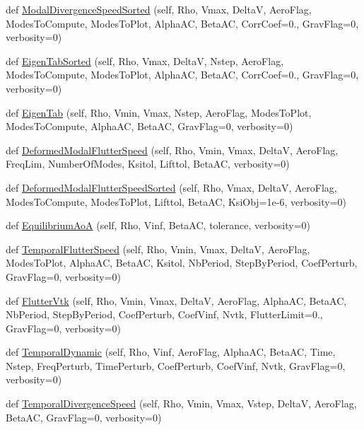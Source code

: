 \begin{DoxyCompactItemize}
\item 
def \hyperlink{classgebtaero_1_1_simulation_1_1_simulation_a597d75e677892bd4308a6537a27eedb8}{Modal\+Divergence\+Speed\+Sorted} (self, Rho, Vmax, DeltaV, Aero\+Flag, Modes\+To\+Compute, Modes\+To\+Plot, Alpha\+AC, Beta\+AC, Corr\+Coef=0., Grav\+Flag=0, verbosity=0)
\item 
def \hyperlink{classgebtaero_1_1_simulation_1_1_simulation_ae64bf3c9cef715d9d999acef888a840e}{Eigen\+Tab\+Sorted} (self, Rho, Vmax, DeltaV, Nstep, Aero\+Flag, Modes\+To\+Compute, Modes\+To\+Plot, Alpha\+AC, Beta\+AC, Corr\+Coef=0., Grav\+Flag=0, verbosity=0)
\item 
def \hyperlink{classgebtaero_1_1_simulation_1_1_simulation_a2907ad4a52664321ef36ca2d05a5ea64}{Eigen\+Tab} (self, Rho, Vmin, Vmax, Nstep, Aero\+Flag, Modes\+To\+Plot, Modes\+To\+Compute, Alpha\+AC, Beta\+AC, Grav\+Flag=0, verbosity=0)
\item 
def \hyperlink{classgebtaero_1_1_simulation_1_1_simulation_a0e2bbc13e4dd2169d7f5a868b7295bd9}{Deformed\+Modal\+Flutter\+Speed} (self, Rho, Vmin, Vmax, DeltaV, Aero\+Flag, Freq\+Lim, Number\+Of\+Modes, Ksitol, Lifttol, Beta\+AC, verbosity=0)
\item 
def \hyperlink{classgebtaero_1_1_simulation_1_1_simulation_a90e05cff1aefd9b6455b6bb1c96d78e4}{Deformed\+Modal\+Flutter\+Speed\+Sorted} (self, Rho, Vmax, DeltaV, Aero\+Flag, Modes\+To\+Compute, Modes\+To\+Plot, Lifttol, Beta\+AC, Ksi\+Obj=1e-\/6, verbosity=0)
\item 
def \hyperlink{classgebtaero_1_1_simulation_1_1_simulation_a36a121ab1505362902de50041d6c2e5d}{Equilibrium\+AoA} (self, Rho, Vinf, Beta\+AC, tolerance, verbosity=0)
\item 
def \hyperlink{classgebtaero_1_1_simulation_1_1_simulation_a5c540ad628ae1dd51acbe119b317e1ca}{Temporal\+Flutter\+Speed} (self, Rho, Vmin, Vmax, DeltaV, Aero\+Flag, Modes\+To\+Plot, Alpha\+AC, Beta\+AC, Ksitol, Nb\+Period, Step\+By\+Period, Coef\+Perturb, Grav\+Flag=0, verbosity=0)
\item 
def \hyperlink{classgebtaero_1_1_simulation_1_1_simulation_ac4f1096583af146da5e23f4365958f3a}{Flutter\+Vtk} (self, Rho, Vmin, Vmax, DeltaV, Aero\+Flag, Alpha\+AC, Beta\+AC, Nb\+Period, Step\+By\+Period, Coef\+Perturb, Coef\+Vinf, Nvtk, Flutter\+Limit=0., Grav\+Flag=0, verbosity=0)
\item 
def \hyperlink{classgebtaero_1_1_simulation_1_1_simulation_afcb65f640228d363296f763b98e68248}{Temporal\+Dynamic} (self, Rho, Vinf, Aero\+Flag, Alpha\+AC, Beta\+AC, Time, Nstep, Freq\+Perturb, Time\+Perturb, Coef\+Perturb, Coef\+Vinf, Nvtk, Grav\+Flag=0, verbosity=0)
\item 
def \hyperlink{classgebtaero_1_1_simulation_1_1_simulation_ac3dce2054614b2bbcac1bf97ab9e4ace}{Temporal\+Divergence\+Speed} (self, Rho, Vmin, Vmax, Vstep, DeltaV, Aero\+Flag, Beta\+AC, Grav\+Flag=0, verbosity=0)
\end{DoxyCompactItemize}
